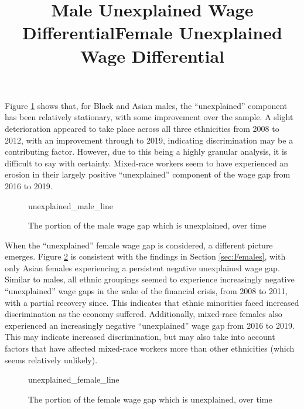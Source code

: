 \documentclass[class=article, crop=false]{standalone}
\begin{document}
Figure \ref{fig:unexplained_male_line} shows that, for Black and Asian males, the \enquote{unexplained} component has been relatively stationary, with some improvement over the sample. A slight deterioration appeared to take place across all three ethnicities from 2008 to 2012, with an improvement through to 2019, indicating discrimination may be a contributing factor. However, due to this being a highly granular analysis, it is difficult to say with certainty. Mixed-race workers seem to have experienced an erosion in their largely positive \enquote{unexplained} component of the wage gap from 2016 to 2019.

\begin{figure}[h]
\centering
    \title{Male Unexplained Wage Differential}
    {unexplained_male_line}
    \caption{The portion of the male wage gap which is unexplained, over time}
    \label{fig:unexplained_male_line}
\end{figure}

When the \enquote{unexplained} female wage gap is considered, a different picture emerges. Figure \ref{fig:unexplained_female_line} is consistent with the findings in Section \ref{sec:Females}, with only Asian females experiencing a persistent negative unexplained wage gap. Similar to males, all ethnic groupings seemed to experience increasingly negative \enquote{unexplained} wage gaps in the wake of the financial crisis, from 2008 to 2011, with a partial recovery since. This indicates that ethnic minorities faced increased discrimination as the economy suffered. Additionally, mixed-race females also experienced an increasingly negative \enquote{unexplained} wage gap from 2016 to 2019. This may indicate increased discrimination, but may also take into account factors that have affected mixed-race workers more than other ethnicities (which seems relatively unlikely).

\begin{figure}[h]
\centering
    \title{Female Unexplained Wage Differential}
    {unexplained_female_line}
    \caption{The portion of the female wage gap which is unexplained, over time}
    \label{fig:unexplained_female_line}
\end{figure}



\ifstandalone

\fi
\end{document}
